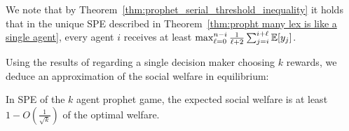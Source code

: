 We note that by Theorem~\ref{thm:prophet_serial_threshold_inequality} it holds that
in the unique SPE described in Theorem~\ref{thm:propht many lex is like a single agent}, every agent  $i$ receives at least $\max_{\ell=0}^{n-i} \frac{1}{\ell+2}\sum_{j=i}^{i+\ell} \mathbb{E} [y_j]$. 

Using the results of \citet{alaei2011bayesian} regarding a single decision maker choosing $k$ rewards, we deduce an approximation of the social welfare in equilibrium:
\begin{corollary} \label{cor:welfare_prophet}
	In SPE of the $k$ agent prophet game, the expected social welfare is at least $1-O(\frac{1}{\sqrt{k}})$ of the optimal welfare.
\end{corollary}


